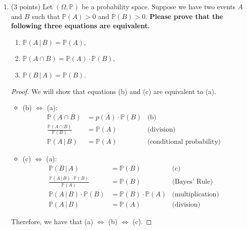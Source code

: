 \documentclass[11pt]{article}
\newcommand{\p}{\mathbb{P}}
\begin{document}
\begin{enumerate}
\begin{proof}
  \begin{align*}
    \p(\text{``snow tomorrow"}\,|\,\text{``snow today"}) &= \frac{\p(\text{``snow tomorrow"}\cap \text{``snow today"})}{\p(\text{``snow today"})}\\
    &= 0.25/3\\
    &= 5/6
  \end{align*}
\end{proof}

\item (3 points) Let $(\Omega,\mathbb{P})$ be a probability space. Suppose we have two events $A$ and $B$ such that $\mathbb{P}(A)>0$ and $\mathbb{P}(B)>0$. \textbf{Please prove that the following three equations are equivalent.}
    \begin{enumerate}
        \item $\mathbb{P}(A\,\vert\,B)=\mathbb{P}(A)$,
        \item $\mathbb{P}(A\cap B)=\mathbb{P}(A)\cdot \mathbb{P}(B)$,
        \item $\mathbb{P}(B\,\vert\,A)=\mathbb{P}(B)$.
    \end{enumerate}

\begin{proof}
  We will show that equations (b) and (c) are equivalent to (a).
  \begin{itemize}
    \item (b) \(\Longleftrightarrow\) (a):
    \begin{align*}
      \p(A\cap B) &= p(A)\cdot \p(B) & \text{(b)}\\
      \frac{\p(A\cap B)}{\p(B)}&= \p(A) & \text{(division)}\\
      \p(A\,|\,B)&=\p(A) & \text{(conditional probability)}
    \end{align*}
    \item (c) \(\Longleftrightarrow\) (a):
    \begin{align*}
      \p(B\,|\,A) &= \p(B) & \text{(c)}\\
      \frac{\p(A\,|\,B)\cdot \p(B)}{\p(A)} &= \p(B) & \text{(Bayes' Rule)}\\
      \p(A\,|\,B)\cdot \p(B) &= \p(B)\cdot \p(A) & \text{(multiplication)}\\
      \p(A\,|\,B) &= \p(A) & \text{(division)}
    \end{align*}
  \end{itemize}
  Therefore, we have that (a) \(\Longleftrightarrow\) (b) \(\Longleftrightarrow\) (c).
\end{proof}

\end{enumerate}
\end{document}
